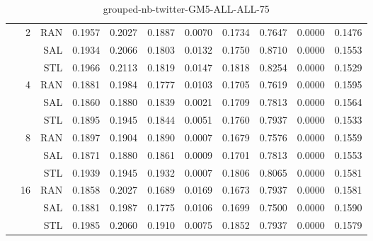 \begin{center}
\begin{table}[htbp]
\begin{center}
\begin{tabular}{ | r | r | r | r | r | r | r | r | r | r | r |}
 & \multirow{3}{*}{2} & RAN & 0.1957 & 0.2027 & 0.1887 & 0.0070 & 0.1734 & 0.7647 & 0.0000 & 0.1476\\ \cline{3-11}
 &   & SAL & 0.1934 & 0.2066 & 0.1803 & 0.0132 & 0.1750 & 0.8710 & 0.0000 & 0.1553\\ \cline{3-11}
 &   & STL & 0.1966 & 0.2113 & 0.1819 & 0.0147 & 0.1818 & 0.8254 & 0.0000 & 0.1529\\ \cline{2-11}
 & \multirow{3}{*}{4} & RAN & 0.1881 & 0.1984 & 0.1777 & 0.0103 & 0.1705 & 0.7619 & 0.0000 & 0.1595\\ \cline{3-11}
 &   & SAL & 0.1860 & 0.1880 & 0.1839 & 0.0021 & 0.1709 & 0.7813 & 0.0000 & 0.1564\\ \cline{3-11}
 &   & STL & 0.1895 & 0.1945 & 0.1844 & 0.0051 & 0.1760 & 0.7937 & 0.0000 & 0.1533\\ \cline{2-11}
 & \multirow{3}{*}{8} & RAN & 0.1897 & 0.1904 & 0.1890 & 0.0007 & 0.1679 & 0.7576 & 0.0000 & 0.1559\\ \cline{3-11}
 &   & SAL & 0.1871 & 0.1880 & 0.1861 & 0.0009 & 0.1701 & 0.7813 & 0.0000 & 0.1553\\ \cline{3-11}
 &   & STL & 0.1939 & 0.1945 & 0.1932 & 0.0007 & 0.1806 & 0.8065 & 0.0000 & 0.1581\\ \cline{2-11}
 & \multirow{3}{*}{16} & RAN & 0.1858 & 0.2027 & 0.1689 & 0.0169 & 0.1673 & 0.7937 & 0.0000 & 0.1581\\ \cline{3-11}
 &   & SAL & 0.1881 & 0.1987 & 0.1775 & 0.0106 & 0.1699 & 0.7500 & 0.0000 & 0.1590\\ \cline{3-11}
 &   & STL & 0.1985 & 0.2060 & 0.1910 & 0.0075 & 0.1852 & 0.7937 & 0.0000 & 0.1579\\ \cline{2-11}
\hline
\end{tabular}
\caption{grouped-nb-twitter-GM5-ALL-ALL-75}
\end{center}
 \end{table}
\end{center}

